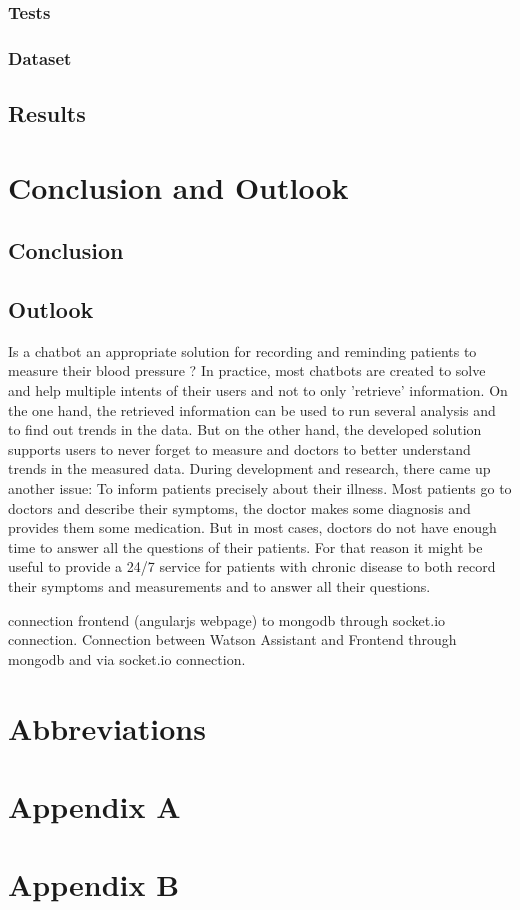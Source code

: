 \subsection{Tests}
\subsection{Dataset}
\section{Results}

\chapter{Conclusion and Outlook }
\section{Conclusion}

\section{Outlook}
Is a chatbot an appropriate solution for recording and reminding patients to measure their blood pressure ? 
In practice, most chatbots are created to solve and help multiple intents of their users and not to only 'retrieve' information.
On the one hand, the retrieved information can be used to run several analysis and to find out trends in the data. But on the other hand, the developed solution  supports users to never forget to measure and doctors to better understand trends in the measured data.
During development and research, there came up another issue: To inform patients precisely about their illness. Most patients go to doctors and describe their symptoms, the doctor makes some diagnosis and provides them some medication. But in most cases, doctors do not have enough time to answer all the questions of their patients. For that reason it might be useful to provide a 24/7 service for patients with chronic disease to both record their symptoms and measurements and to answer all their questions.


connection frontend (angularjs webpage) to mongodb through socket.io connection.
Connection between Watson Assistant and Frontend through mongodb and via socket.io connection.




\chapter{Abbreviations}

\printbibliography

\chapter{Appendix A}\label{appendix a}

\chapter{Appendix B}\label{appendix b}
%


